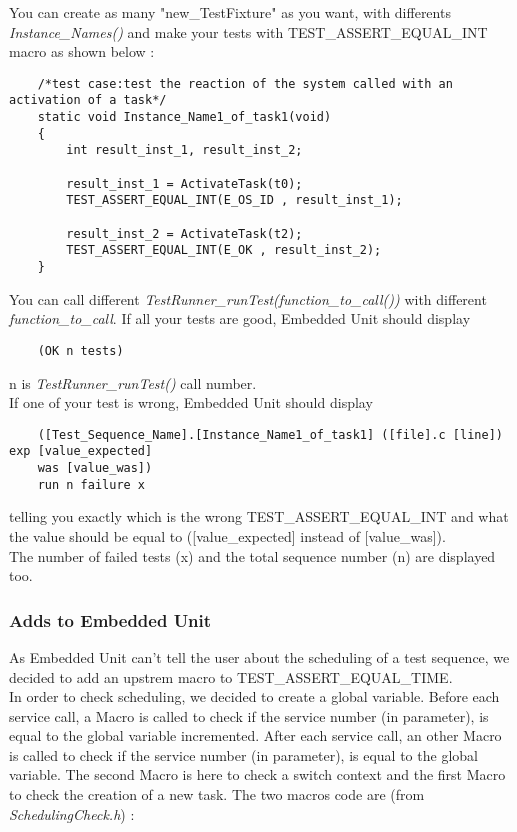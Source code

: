 \documentclass[10pt]{article}
\begin{document}
	You can create as many "new\_TestFixture" as you want, with differents \textit{Instance\_Names()} and make your tests with TEST\_ASSERT\_EQUAL\_INT macro as shown below :
	\begin{lstlisting}
	/*test case:test the reaction of the system called with an activation of a task*/
	static void Instance_Name1_of_task1(void)
	{	
		int result_inst_1, result_inst_2;
	
		result_inst_1 = ActivateTask(t0);
		TEST_ASSERT_EQUAL_INT(E_OS_ID , result_inst_1);
	
		result_inst_2 = ActivateTask(t2);
		TEST_ASSERT_EQUAL_INT(E_OK , result_inst_2);
	}
	\end{lstlisting}
	
	You can call different \textit{TestRunner\_runTest(function\_to\_call())} with different \textit{function\_to\_call}. If all your tests are good, Embedded Unit should display
	\small
	\begin{verbatim}
	(OK n tests)
	\end{verbatim}
	\normalsize

	n is \textit{TestRunner\_runTest()} call number.\\
	If one of your test is wrong, Embedded Unit should display
	\small
	\begin{verbatim}
	([Test_Sequence_Name].[Instance_Name1_of_task1] ([file].c [line]) exp [value_expected]
	was [value_was])
	run n failure x
	\end{verbatim}
	\normalsize
	telling you exactly which is the wrong TEST\_ASSERT\_EQUAL\_INT and what the value should be equal to ([value\_expected] instead of [value\_was]). \\
	The number of failed tests (x) and the total sequence number (n) are displayed too.
		
	\subsubsection{Adds to Embedded Unit}
	As Embedded Unit can't tell the user about the scheduling of a test sequence, we decided to add an upstrem macro to TEST\_ASSERT\_EQUAL\_TIME.\\
	In order to check scheduling, we decided to create a global variable. Before each service call, a Macro is called to check if the service number (in parameter), is equal to the global variable incremented. After each service call, an other Macro is called to check if the service number (in parameter), is equal to the global variable.
	The second Macro is here to check a switch context and the first Macro to check the creation of a new task.
	The two macros code are (from \textit{SchedulingCheck.h}) :
	
\end{document}
